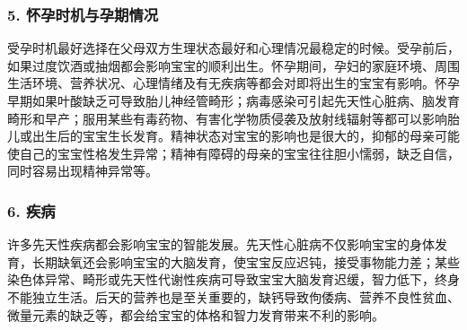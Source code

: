 \documentclass[
]{article}
\begin{document}
\hypertarget{ux6000ux5b55ux65f6ux673aux4e0eux5b55ux671fux60c5ux51b5}{%
\subsubsection{5.
怀孕时机与孕期情况}\label{ux6000ux5b55ux65f6ux673aux4e0eux5b55ux671fux60c5ux51b5}}

受孕时机最好选择在父母双方生理状态最好和心理情况最稳定的时候。受孕前后，如果过度饮酒或抽烟都会影响宝宝的顺利出生。怀孕期间，孕妇的家庭环境、周围生活环境、营养状况、心理情绪及有无疾病等都会对即将出生的宝宝有影响。怀孕早期如果叶酸缺乏可导致胎儿神经管畸形；病毒感染可引起先天性心脏病、脑发育畸形和早产；服用某些有毒药物、有害化学物质侵袭及放射线辐射等都可以影响胎儿或出生后的宝宝生长发育。精神状态对宝宝的影响也是很大的，抑郁的母亲可能使自己的宝宝性格发生异常；精神有障碍的母亲的宝宝往往胆小懦弱，缺乏自信，同时容易出现精神异常等。

\hypertarget{ux75beux75c5}{%
\subsubsection{6. 疾病}\label{ux75beux75c5}}

许多先天性疾病都会影响宝宝的智能发展。先天性心脏病不仅影响宝宝的身体发育，长期缺氧还会影响宝宝的大脑发育，使宝宝反应迟钝，接受事物能力差；某些染色体异常、畸形或先天性代谢性疾病可导致宝宝大脑发育迟缓，智力低下，终身不能独立生活。后天的营养也是至关重要的，缺钙导致佝倭病、营养不良性贫血、微量元素的缺乏等，都会给宝宝的体格和智力发育带来不利的影响。

‍
\end{document}
